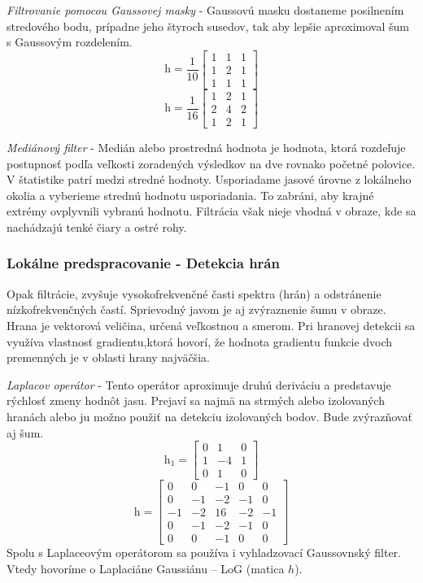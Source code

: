 \textit{Filtrovanie pomocou Gaussovej masky} - Gaussovú masku dostaneme posilnením stredového bodu, prípadne jeho štyroch susedov, tak aby lepšie aproximoval šum s Gaussovým rozdelením.
$$\textit{h}=\frac{1}{10}\begin{bmatrix} 1 & 1 & 1 \\ 1 & 2 & 1 \\ 1 & 1 & 1  \end{bmatrix}$$
$$\textit{h}=\frac{1}{16}\begin{bmatrix} 1 & 2 & 1 \\ 2 & 4 & 2 \\ 1 & 2 & 1  \end{bmatrix}$$

\textit{Mediánový filter} - Medián alebo prostredná hodnota je hodnota, ktorá rozdeľuje postupnosť podľa veľkosti zoradených výsledkov na dve rovnako početné polovice. V štatistike patrí medzi stredné hodnoty. Usporiadame jasové úrovne z lokálneho okolia a vyberieme strednú hodnotu usporiadania. To zabráni, aby krajné extrémy ovplyvnili vybranú hodnotu. Filtrácia však nieje vhodná v obraze, kde sa nachádzajú tenké čiary a ostré rohy. 


\subsubsection{Lokálne predspracovanie - Detekcia hrán}
Opak filtrácie, zvyšuje vysokofrekvenčné časti spektra (hrán) a odstránenie nízkofrekvenčných častí. Sprievodný javom je aj zvýraznenie šumu v obraze.  Hrana je vektorová veličina, určená veľkostnou a smerom. Pri hranovej detekcii sa využíva vlastnosť gradientu,ktorá hovorí, že hodnota gradientu funkcie dvoch premenných je v oblasti hrany najväčšia. 

\textit{Laplacov operátor} - Tento operátor aproximuje druhú deriváciu a predstavuje rýchlosť zmeny hodnôt jasu. Prejaví sa najmä na strmých alebo izolovaných hranách alebo ju možno použiť na detekciu izolovaných bodov. Bude zvýrazňovať aj šum.
$$\textit{h}_1=\begin{bmatrix} 0 & 1 & 0 \\ 1 & -4 & 1 \\ 0 & 1 & 0  \end{bmatrix}$$
$$\textit{h}=\begin{bmatrix} 0 & 0 & -1 & 0 & 0 \\ 0 & -1 & -2 & -1 & 0 \\ -1 & -2 & 16 & -2 & -1 \\ 0 & -1 & -2 & -1 & 0 \\ 0 & 0 & -1 & 0 & 0  \end{bmatrix}$$
Spolu s Laplaceovým operátorom sa používa i vyhladzovací Gaussovnský filter. Vtedy hovoríme o Laplaciáne Gaussiánu – LoG (matica $h$).

